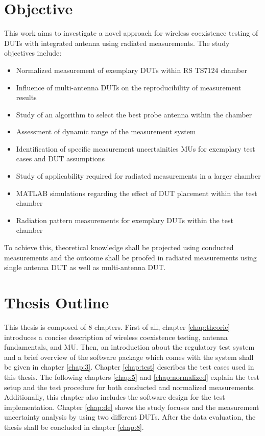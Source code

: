 \section{Objective}
This work aims to investigate a novel approach for wireless coexistence testing of \acsp{DUT} with integrated antenna using radiated measurements. The study objectives include:
\begin{itemize}
\item Normalized measurement of exemplary \acsp{DUT} within \ac{RS} TS7124 chamber
\item Influence of multi-antenna \acsp{DUT} on the reproducibility of measurement results
\item Study of an algorithm to select the best probe antenna within the chamber
\item Assessment of dynamic range of the measurement system
\item Identification of specific measurement uncertainities \acsp{MU} for exemplary test cases and \acs{DUT} assumptions
\item Study of applicability required for radiated measurements in a larger chamber
\item MATLAB simulations regarding the effect of \acs{DUT} placement within the test chamber
\item Radiation pattern measurements for exemplary \acsp{DUT} within the test chamber
\end{itemize}
To achieve this, theoretical knowledge shall be projected using conducted measurements and the outcome shall be proofed in radiated measurements using single antenna \acs{DUT} as well as multi-antenna \acs{DUT}. 

\section{Thesis Outline}
This thesis is composed of 8 chapters. First of all, chapter \ref{chap:theorie} introduces a concise description of wireless coexistence testing, antenna fundamentals, and \acf{MU}. Then, an introduction about the regulatory test system and a brief overview of the software package which comes with the system shall be given in chapter \ref{chap:3}. Chapter  \ref{chap:test} describes the test cases used in this thesis. The following chapters  \ref{chap:5} and  \ref{chap:normalized} explain the test setup and the test procedure for both conducted and normalized measurements. Additionally, this chapter also includes the software design for the test implementation. Chapter \ref{chap:de} shows the study focuses and the measurement uncertainty analysis by using two different \acsp{DUT}. After the data evaluation, the thesis shall be concluded in chapter \ref{chap:8}. 










